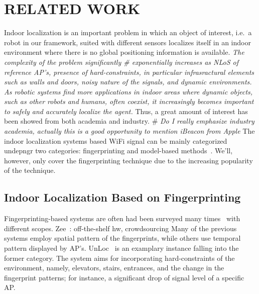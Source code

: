 \documentclass[conference]{IEEEtran}
\begin{document}
  \section{\label{sec-RW}RELATED WORK}
    Indoor localization is an important problem in which an object of interest, i.e.\ a robot in our framework, suited with different sensors localizes itself in an indoor environment where there is no global positioning information is available.
    \textit{The complexity of the problem significantly \# \textit{exponentially} increases as NLoS of reference AP's, presence of hard-constraints, in particular infrasractural elements such as walls and doors, noisy nature of the signals, and dynamic environments.}~\cite{liu2007survey}
    \textit{As robotic systems find more applications in indoor areas where dynamic objects, such as other robots and humans, often coexist, it increasingly becomes important to safely and accurately localize the agent.} %
    Thus, a great amount of interest has been showed from both academia and industry.
    \# \textit{Do I really emphasize industry academia, actually this is a good opportunity to mention iBeacon from Apple}
    The indoor localization systems based WiFi signal can be mainly categorized undepngr two categories: fingerprinting and model-based methods~\cite{hossain2015survey}.
    We'll, however, only cover the fingerprinting technique due to the increasing popularity of the technique.

    \subsection{Indoor Localization Based on Fingerprinting}
      Fingerprinting-based systems are often   had been surveyed many times~\cite{he2016wi} with different scopes.
      Zee~\cite{rai2012zee}: off-the-shelf hw, crowdsourcing
      Many of the previous systems employ spatial pattern of the fingerprints, while others use temporal pattern displayed by AP's.
      UnLoc~\cite{wang2012no} is an examplary instance falling into the former category.
      The system aims for incorporating hard-constraints of the environment, namely, elevators, stairs, entrances, and the change in the fingerprint patterns; for instance, a significant drop of signal level of a specific AP\@.
\end{document}
